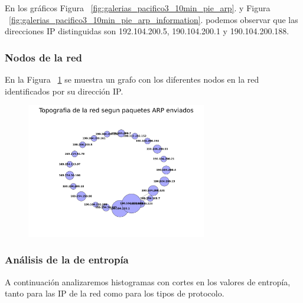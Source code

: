 En los gráficos Figura ~\ref{fig:galerias_pacifico3_10min_pie_arp}. y Figura ~\ref{fig:galerias_pacifico3_10min_pie_arp_information}.
podemos observar que las direcciones IP distinguidas son 192.104.200.5, 190.104.200.1 y 190.104.200.188. 

\FloatBarrier

\subsubsection{Nodos de la red}

En la Figura ~\ref{fig:galerias_pacifico3_10min_network} se muestra un grafo con los diferentes nodos en la red identificados por su dirección IP.

\begin{figure}[ht!]
  \centering
   \includegraphics[width=0.7\textwidth]{graficos/galerias_pacifico3_10min_network.png}
  \caption{}
  \label{fig:galerias_pacifico3_10min_network}
\end{figure}

\FloatBarrier

\subsubsection{Análisis de la de entropía}

A continuación analizaremos histogramas con cortes en los valores de entropía, tanto para las IP de la red como para los tipos de protocolo.

